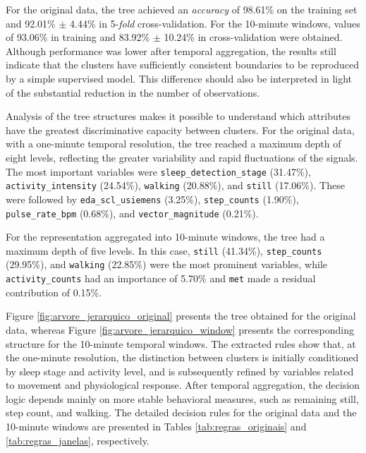 \documentclass[a4paper,fleqn]{cas-sc}
\begin{document}
\begin{center}
\label{tab:arvore_validacao}
\end{center}

For the original data, the tree achieved an \textit{accuracy} of 98.61\% on the training set and 92.01\% $\pm$ 4.44\% in 5-\textit{fold} cross-validation. For the 10-minute windows, values of 93.06\% in training and 83.92\% $\pm$ 10.24\% in cross-validation were obtained. Although performance was lower after temporal aggregation, the results still indicate that the clusters have sufficiently consistent boundaries to be reproduced by a simple supervised model. This difference should also be interpreted in light of the substantial reduction in the number of observations.

Analysis of the tree structures makes it possible to understand which attributes have the greatest discriminative capacity between clusters. For the original data, with a one-minute temporal resolution, the tree reached a maximum depth of eight levels, reflecting the greater variability and rapid fluctuations of the signals. The most important variables were \texttt{sleep\_detection\_stage} (31.47\%), \texttt{activity\_intensity} (24.54\%), \texttt{walking} (20.88\%), and \texttt{still} (17.06\%). These were followed by \texttt{eda\_scl\_usiemens} (3.25\%), \texttt{step\_counts} (1.90\%), \texttt{pulse\_rate\_bpm} (0.68\%), and \texttt{vector\_magnitude} (0.21\%).

For the representation aggregated into 10-minute windows, the tree had a maximum depth of five levels. In this case, \texttt{still} (41.34\%), \texttt{step\_counts} (29.95\%), and \texttt{walking} (22.85\%) were the most prominent variables, while \texttt{activity\_counts} had an importance of 5.70\% and \texttt{met} made a residual contribution of 0.15\%.

Figure \ref{fig:arvore_jerarquico_original} presents the tree obtained for the original data, whereas Figure \ref{fig:arvore_jerarquico_window} presents the corresponding structure for the 10-minute temporal windows. The extracted rules show that, at the one-minute resolution, the distinction between clusters is initially conditioned by sleep stage and activity level, and is subsequently refined by variables related to movement and physiological response. After temporal aggregation, the decision logic depends mainly on more stable behavioral measures, such as remaining still, step count, and walking. The detailed decision rules for the original data and the 10-minute windows are presented in Tables \ref{tab:regras_originais} and \ref{tab:regras_janelas}, respectively.
\end{document}
